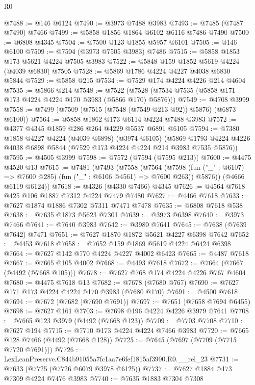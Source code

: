 \begin{lexlean}{R0}
\begin{coremodule}
@7488 := @146 @6124
@7490 := @3973 @7488 @3983
@7493 := @7485 (@7487 @7490) @7466
@7499 := @5858 @1856 @1864 @6102 @6116 @7486 @7490
@7500 := @6808 @4345
@7504 := @7500 @123 @1855 @5957 @6101
@7505 := @146 @6100
@7509 := @7504 (@3973 @7505 @3983) @7486
@7515 := @5858 @1853 @173 @5621 @4224 @7505 @3983
@7522 := @5848 @159 @1852 @5619 @4224 (@4039 @6830) @7505
@7528 := @5869 @1786 @4224 @4227 @4038 @6830 @5844
@7529 := @5858 @215
@7534 := @7529 @174 @4224 @4226 @214 @4604
@7535 := @5866 @214
@7548 := @7522 (@7528 (@7534 @7535 (@5858 @171 @173 @4224 @4224 @170 @3983 (@5866 @170) @5876)))
@7549 := @4708 @3999
@7558 := @7499 (@7509 (@7515 (@7548 (@7549 @213 @92)) @5876) (@6873 @6100))
@7564 := @5858 @1862 @173 @6114 @4224 @7488 @3983
@7572 := @4377 @4345 @1859 @286 @264 @4229 @5537 @6891 @6105
@7594 := @7380
    @1858
    @4227
    @4224
    (@4039 @6898)
    (@3974 @6105)
    (@5869 @1793 @4224 @4226 @4038 @6898 @5844 (@7529 @173 @4224 @4224 @214 @3983 @7535 @5876))
@7595 := @4505 @3999
@7598 := @7572 (@7594 (@7595 @213))
@7600 := @4475 @4520 @13
@7615 := @7481
    (@7493
      (@7558
        (@7564
          (@7598 (fun ("_" : @6107) => @7600 @285) (fun ("_" : @6106 @4561) => @7600 @263))
          @5876))
      (@4666 @6119 @6124))
@7618 := @4326 (@4330 @7466) @4345
@7626 := @4564 @7618 @425 @106 @1887 @7312 @4224 @7479 @7480
@7627 := @4466 @7618
@7633 := @7627 @1874 @1886 @7302 @7311 @7471 @7478
@7635 := @6808 @7618 @538
@7638 := @7635 @1873 @5623 @7301
@7639 := @3973 @6398
@7640 := @3973 @7466
@7641 := @7640 @3983
@7642 := @3980 @7641
@7645 := @7638 (@7639 @7642) @7471
@7651 := @7627 @1870 @1872 @5621 @4227 @6398 @7642
@7652 := @4453 @7618
@7658 := @7652 @159 @1869 @5619 @4224 @6424 @6398
@7664 := @7627 @142 @770 @4224 @4227 @4002 @6423
@7665 := @4487 @7618
@7667 := @7665 @105 @4002
@7668 := @4493 @7618
@7672 := @7664 (@7667 (@4492 (@7668 @105)))
@7678 := @7627 @768 @174 @4224 @4226 @767 @4604
@7680 := @4475 @7618 @13
@7682 := @7678 (@7680 @767)
@7690 := @7627 @171 @173 @4224 @4224 @170 @3983 (@7680 @170)
@7691 := @4500 @7618
@7694 := @7672 (@7682 (@7690 @7691))
@7697 := @7651 (@7658 @7694 @6455)
@7698 := @7627 @161
@7703 := @7698 @196 @4224 @4226 @3979 @7641
@7708 := @7665 @123 @3979 (@4492 (@7668 @123))
@7709 := @7703 @7708
@7710 := @7627 @194
@7715 := @7710 @173 @4224 @4224 @7466 @3983
@7720 := @7665 @128 @7466 (@4492 (@7668 @128))
@7725 := @7645 (@7697 (@7709 (@7715 @7720 @7691)))
@7726 := LexLeanPreserve.C844b91055a7fc1aa7e6fef1815af3990.R0.__rel_23
@7731 := @7633 (@7725 (@7726 @6079 @3978 @6125))
@7737 := @7627 @1884 @173 @7309 @4224 @7476 @3983
@7740 := @7635 @1883 @7304 @7308

\end{coremodule}
\end{lexlean}
